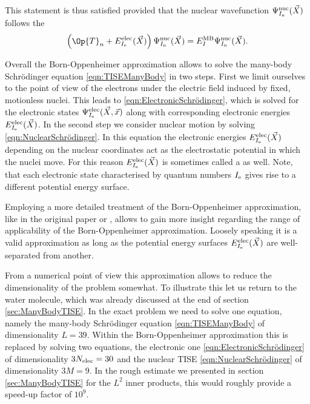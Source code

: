 This statement is thus satisfied provided that the nuclear wavefunction
$\Psi^\text{nuc}_{I_\text{n}}(\vec{X})$
follows the 
\begin{equation}
	\left( \Op{T}_n + E^\text{elec}_{\Iel}(\vec{X}) \right)
	\Psi^\text{nuc}_{\Inu}(\vec{X})
	= E^\text{MB}_I \Psi^\text{nuc}_{\Inu}(\vec{X}).
	\label{eqn:NuclearSchrödinger}
\end{equation}

Overall the Born-Oppenheimer approximation
allows to solve the many-body Schrödinger equation \eqref{eqn:TISEManyBody} in two steps.
First we limit ourselves to the point of view of the electrons
under the electric field induced by fixed, motionless nuclei.
This leads to \eqref{eqn:ElectronicSchrödinger},
which is solved for the
electronic states $\Psi^\text{elec}_{I_\text{e}}(\vec{X}, \vec{x})$
along with corresponding electronic energies $E^\text{elec}_{I_\text{e}}(\vec{X})$.
In the second step we consider nuclear motion by solving
\eqref{eqn:NuclearSchrödinger}.
In this equation the electronic energies $E^\text{elec}_{I_\text{e}}(\vec{X})$
depending on the nuclear coordinates act as the electrostatic potential
in which the nuclei move.
For this reason $E^\text{elec}_{I_\text{e}}(\vec{X})$ is sometimes
called a  as well.
Note, that each electronic state characterised by quantum numbers $I_\text{e}$
gives rise to a different potential energy surface.

Employing a more detailed treatment of the Born-Oppenheimer approximation,
like in the original paper \cite{Born1927} or \citet{Baer2006},
allows to gain more insight regarding the range of applicability
of the Born-Oppenheimer approximation.
Loosely speaking it is a valid approximation
as long as the potential energy surfaces $E^\text{elec}_{I_\text{e}}(\vec{X})$
are well-separated from another.

From a numerical point of view this approximation allows to reduce
the dimensionality of the problem somewhat.
To illustrate this let us return to the water molecule,
which was already discussed at the end of section \vref{sec:ManyBodyTISE}.
In the exact problem we need to solve one equation,
namely the many-body Schrödinger equation \eqref{eqn:TISEManyBody}
of dimensionality $L = 39$.
Within the Born-Oppenheimer approximation
this is replaced by solving two equations,
the electronic one \eqref{eqn:ElectronicSchrödinger} of dimensionality $3 N_\text{elec} = 30$
and the nuclear TISE \eqref{eqn:NuclearSchrödinger} of dimensionality $3 M = 9$.
In the rough estimate we presented in section \vref{sec:ManyBodyTISE}
for the $L^2$ inner products,
this would roughly provide a speed-up factor of $10^9$.


